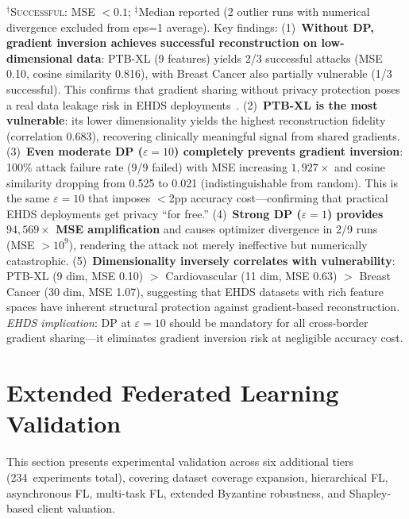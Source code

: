 \documentclass[conference]{IEEEtran}
\begin{document}
\begin{table}[htbp]
\vspace{1mm}
\footnotesize{$^\dagger$\textsc{Successful}: MSE $< 0.1$; $^\ddagger$Median reported (2 outlier runs with numerical divergence excluded from eps=1 average). Key findings: (1)~\textbf{Without DP, gradient inversion achieves successful reconstruction on low-dimensional data}: PTB-XL (9 features) yields 2/3 successful attacks (MSE 0.10, cosine similarity 0.816), with Breast Cancer also partially vulnerable (1/3 successful). This confirms that gradient sharing without privacy protection poses a real data leakage risk in EHDS deployments~\cite{geiping2020inverting}. (2)~\textbf{PTB-XL is the most vulnerable}: its lower dimensionality yields the highest reconstruction fidelity (correlation 0.683), recovering clinically meaningful signal from shared gradients. (3)~\textbf{Even moderate DP ($\varepsilon{=}10$) completely prevents gradient inversion}: 100\% attack failure rate (9/9 failed) with MSE increasing $1{,}927\times$ and cosine similarity dropping from 0.525 to 0.021 (indistinguishable from random). This is the same $\varepsilon{=}10$ that imposes $<$2pp accuracy cost---confirming that practical EHDS deployments get privacy ``for free.'' (4)~\textbf{Strong DP ($\varepsilon{=}1$) provides $94{,}569\times$ MSE amplification} and causes optimizer divergence in 2/9 runs (MSE $>10^{9}$), rendering the attack not merely ineffective but numerically catastrophic. (5)~\textbf{Dimensionality inversely correlates with vulnerability}: PTB-XL (9 dim, MSE 0.10) $>$ Cardiovascular (11 dim, MSE 0.63) $>$ Breast Cancer (30 dim, MSE 1.07), suggesting that EHDS datasets with rich feature spaces have inherent structural protection against gradient-based reconstruction. \textit{EHDS implication}: DP at $\varepsilon{=}10$ should be mandatory for all cross-border gradient sharing---it eliminates gradient inversion risk at negligible accuracy cost.}
\end{table}

\section{Extended Federated Learning Validation}
\label{sec:cascade6}

This section presents experimental validation across six additional tiers (234~experiments total), covering dataset coverage expansion, hierarchical FL, asynchronous FL, multi-task FL, extended Byzantine robustness, and Shapley-based client valuation.
\end{document}
